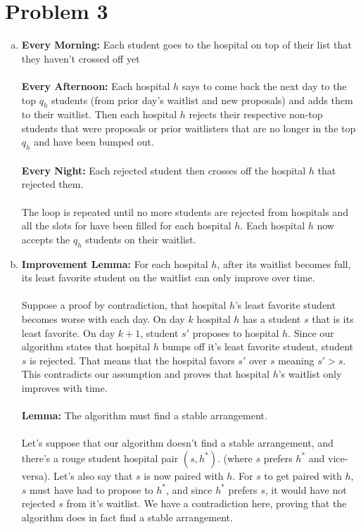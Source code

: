 \documentclass[11pt,letterpaper]{article}
\begin{document}
\section*{Problem 3}
\begin{enumerate}[(a)]
\item
\textbf{Every Morning:} Each student goes to the hospital on top of their list that they haven't  crossed off yet\\
\\
\textbf{Every Afternoon:} Each hospital $h$ says to come back the next day to the top $q_h$ students (from prior day's waitlist and new proposals) and adds them to their waitlist. Then each hospital $h$ rejects their respective non-top students that were proposals or prior waitlisters that are no longer in the top $q_h$ and have been bumped out.\\
\\
\textbf{Every Night:} Each rejected student then crosses off the hospital $h$ that rejected them.\\
\\
The loop is repeated until no more students are rejected from hospitals and all the slots for have been filled for each hospital $h$. Each hospital $h$ now accepts the $q_h$ students on their waitlist.\\

\item
\textbf{Improvement Lemma:} For each hospital $h$, after its waitlist becomes full, its least favorite student on the waitlist can only improve over time.
\\
\\
Suppose a proof by contradiction, that hospital $h$'s least favorite student becomes worse with each day. On day $k$ hospital $h$ has a student $s$ that is its least favorite. On day $k+1$, student $s\prime$ proposes to hospital $h$. Since our algorithm states that hospital $h$ bumps off it's least favorite student, student $s$ is rejected. That means that the hospital favors $s\prime$ over $s$ meaning $s\prime > s$. This contradicts our assumption and proves that hospital $h$'s waitlist only improves with time.
\\\\
\textbf{Lemma:} The algorithm must find a stable arrangement.\\
\\
Let's suppose that our algorithm doesn't find a stable arrangement, and there's a rouge student hospital pair $(s,h^*)$. (where $s$ prefers $h^*$ and vice-versa). Let's also say that $s$ is now paired with $h$. For $s$ to get paired with $h$, $s$ must have had to propose to $h^*$, and since $h^*$ prefers $s$, it would have not rejected $s$ from it's waitlist. We have a contradiction here, proving that the algorithm does in fact find a stable arrangement.\\

\end{enumerate}
\clearpage
\end{document}
